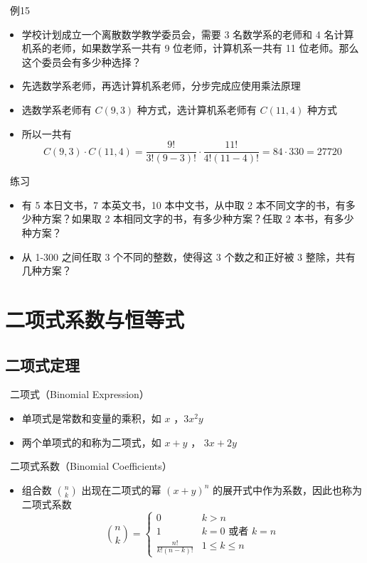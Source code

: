 \documentclass[UTF8]{report}
\theoremstyle{MyLineTheoremStyle} %
\theoremstyle{MyBlockTheoremStyle} %
\theoremstyle{MySubsubsectionStyle} %
\begin{document}
\textbullet\ 例15
\begin{itemize}
    \item 学校计划成立一个离散数学教学委员会，需要 3 名数学系的老师和 4 名计算机系的老师，如果数学系一共有 9 位老师，计算机系一共有 11 位老师。那么这个委员会有多少种选择？
    \item 先选数学系老师，再选计算机系老师，分步完成应使用乘法原理
    \item 选数学系老师有 $C(9,3)$ 种方式，选计算机系老师有 $C(11,4)$ 种方式
    \item 所以一共有
    \[
    C(9,3) \cdot C(11,4) = \frac{9!}{3!(9-3)!} \cdot \frac{11!}{4!(11-4)!} = 84 \cdot 330 = 27720
    \]
\end{itemize}

\textbullet\ 练习
\begin{itemize}
    \item 有 5 本日文书，7 本英文书，10 本中文书，从中取 2 本不同文字的书，有多少种方案？如果取 2 本相同文字的书，有多少种方案？任取 2 本书，有多少种方案？
    \item 从 1-300 之间任取 3 个不同的整数，使得这 3 个数之和正好被 3 整除，共有几种方案？
\end{itemize}

\section{二项式系数与恒等式}
\subsection{二项式定理}
\textbullet\ 二项式（Binomial Expression）
\begin{itemize}
    \item 单项式是常数和变量的乘积，如 $x$ ，$3x^2y$
    \item 两个单项式的和称为二项式，如 $x + y$ ， $3x + 2y$
\end{itemize}

\textbullet\ 二项式系数（Binomial Coefficients）
\begin{itemize}
    \item 组合数 $\binom{n}{k}$ 出现在二项式的幂 $(x + y)^n$ 的展开式中作为系数，因此也称为二项式系数
    \[
    \binom{n}{k} =
    \begin{cases}
        0 & k > n \\
        1 & k = 0 \text{ 或者 } k = n \\
        \frac{n!}{k!(n-k)!} & 1 \leq k \leq n
    \end{cases}
    \]
\end{itemize}
\end{document}
